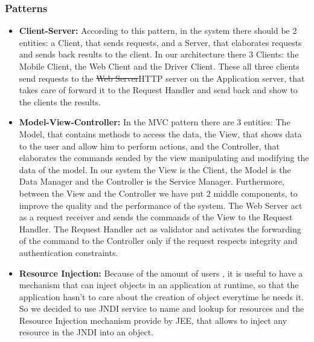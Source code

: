 \subsubsection{Patterns}

\begin{itemize}
\item {\textbf{Client-Server:}} According to this pattern, in the system there should be 2 entities: a Client, that sends requests, and a Server, that elaborates requests and sends back results to the client. In our architecture there 3 Clients: the Mobile Client, the Web Client and the Driver Client. These all three  clients send requests to the \st{Web Server}HTTP server on the Application server, that takes care of forward it to the Request Handler and send back and show to the clients the results.


\item{\textbf{Model-View-Controller:}} In the MVC pattern there are 3 entities: The Model, that contains methods to access the data, the View, that shows data to the user and allow him to perform actions, and the Controller, that elaborates the commands sended by the view manipulating and modifying  the data of the model.
In our system the View is the Client, the Model is the Data Manager and the Controller is the Service Manager. Furthermore, between the View and the Controller we have put 2 middle components, to improve the quality and the performance of the system. The Web Server act as a request receiver and sends the commands of the View to the Request Handler. The Request Handler act as validator and activates the forwarding of the command to the Controller only if the request respects integrity and authentication constraints.

\item{\textbf{Resource Injection:}} Because of the amount of users , it is useful to have a mechanism that can inject objects in an application at runtime, so that the application hasn't to care about the creation of object everytime he needs it. So we decided to use JNDI service to name and lookup for resources and the Resource Injection mechanism provide by JEE, that allows to inject any resource in the JNDI into an object.


\end{itemize}


